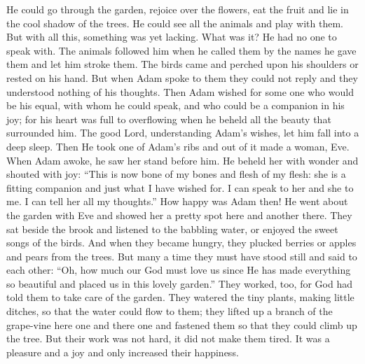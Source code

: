 He could go through the garden, rejoice over the flowers, eat the fruit and lie in the cool shadow of the trees. He could see all the animals and play with them. But with all this, something was yet lacking. What was it? He had no one to speak with. The animals followed him when he called them by the names he gave them and let him stroke them. The birds came and perched upon his shoulders
or rested on his hand. But when Adam spoke to them they could not reply and they understood nothing of his thoughts. Then Adam wished for some one who would be his equal, with whom he could speak, and who could be a companion in his joy; for his heart was full to overflowing when he beheld all the beauty that surrounded him. The good Lord, understanding Adam’s wishes, let him fall into a deep sleep. Then He took one of Adam’s ribs and out of it made a woman, Eve. When Adam awoke, he saw her stand before him. He beheld her with wonder and shouted with joy: “This is now bone of my bones and flesh of my flesh: she is a fitting companion and just what I have wished for. I can speak to her and she to me. I can tell her all my thoughts.” How happy was Adam then! He went about the garden with Eve and showed her a pretty spot here and another there. They sat beside the brook and listened to the babbling water, or enjoyed the sweet songs of the birds. And when they became hungry, they plucked berries or apples and pears from the trees. But many a time they must have stood still and said to each other: “Oh, how much our God must love us since He has made everything so beautiful and placed us in this lovely garden.” They worked, too, for God had told them to take care of the garden. They watered the tiny plants, making little ditches, so that the water could flow to them; they lifted up a branch of the grape-vine here one and there one and fastened them so that they could climb up the tree. But their work was not hard, it did not make them tired. It was a pleasure and a joy and only increased their happiness.

